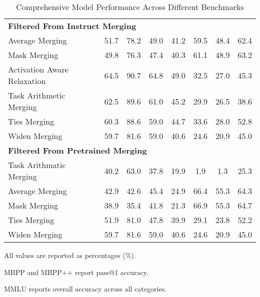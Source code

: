 \begin{table}[htbp]
{\begin{tabular}{lccccccc}
\midrule
\multicolumn{8}{l}{\textbf{Filtered From Instruct Merging}} \\
Average Merging & 51.7 & 78.2 & 49.0 & 41.2 & 59.5 & 48.4 & 62.4 \\
Mask Merging & 49.8 & 76.3 & 47.4 & 40.3 & 61.1 & 48.9 & 63.2 \\
Activation Aware Relaxation & 64.5 & 90.7 & 64.8 & 49.0 & 32.5 & 27.0 & 45.3 \\
Task Arithmetic Merging & 62.5 & 89.6 & 61.0 & 45.2 & 29.9 & 26.5 & 38.6 \\
Ties Merging & 60.3 & 88.6 & 59.0 & 44.7 & 33.6 & 28.0 & 52.8 \\
Widen Merging & 59.7 & 81.6 & 59.0 & 40.6 & 24.6 & 20.9 & 45.0 \\
\midrule
\multicolumn{8}{l}{\textbf{Filtered From Pretrained Merging}} \\
Task Arithmatic Merging & 40.2 & 63.0 & 37.8 & 19.9 & 1.9 & 1.3 & 25.3 \\
Average Merging & 42.9 & 42.6 & 45.4 & 24.9 & 66.4 & 55.3 & 64.3 \\
Mask Merging & 38.9 & 35.4 & 41.8 & 21.3 & 66.9 & 55.3 & 64.7 \\
Ties Merging & 51.9 & 81.0 & 47.8 & 39.9 & 29.1 & 23.8 & 52.2 \\
Widen Merging & 59.7 & 81.6 & 59.0 & 40.6 & 24.6 & 20.9 & 45.0 \\
\bottomrule
\end{tabular}
}
\caption{Comprehensive Model Performance Across Different Benchmarks}
\label{tab:comprehensive-results}
\begin{tablenotes}
\small
\item All values are reported as percentages (\%).
\item MBPP and MBPP++ report pass@1 accuracy.
\item MMLU reports overall accuracy across all categories.
\end{tablenotes}
\end{table}